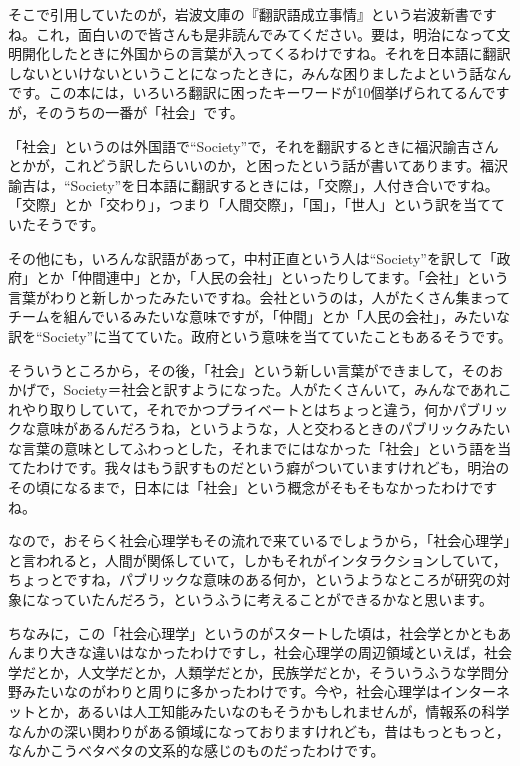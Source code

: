\documentclass{ltjsbook}
\begin{document}
そこで引用していたのが，岩波文庫の『翻訳語成立事情』\parencite{SPhonyaku}という岩波新書ですね。これ，面白いので皆さんも是非読んでみてください。要は，明治になって文明開化したときに外国からの言葉が入ってくるわけですね。それを日本語に翻訳しないといけないということになったときに，みんな困りましたよという話なんです。この本には，いろいろ翻訳に困ったキーワードが10個挙げられてるんですが，そのうちの一番が「社会」です。

「社会」というのは外国語で``Society''で，それを翻訳するときに福沢諭吉さんとかが，これどう訳したらいいのか，と困ったという話が書いてあります。福沢諭吉は，``Society''を日本語に翻訳するときには，「交際」，人付き合いですね。「交際」とか「交わり」，つまり「人間交際」，「国」，「世人」という訳を当てていたそうです。

その他にも，いろんな訳語があって，中村正直という人は``Society''を訳して「政府」とか「仲間連中」とか，「人民の会社」といったりしてます。「会社」という言葉がわりと新しかったみたいですね。会社というのは，人がたくさん集まってチームを組んでいるみたいな意味ですが，「仲間」とか「人民の会社」，みたいな訳を``Society''に当てていた。政府という意味を当てていたこともあるそうです。

そういうところから，その後，「社会」という新しい言葉ができまして，そのおかげで，Society＝社会と訳すようになった。人がたくさんいて，みんなであれこれやり取りしていて，それでかつプライベートとはちょっと違う，何かパブリックな意味があるんだろうね，というような，人と交わるときのパブリックみたいな言葉の意味としてふわっとした，それまでにはなかった「社会」という語を当てたわけです。我々はもう訳すものだという癖がついていますけれども，明治のその頃になるまで，日本には「社会」という概念がそもそもなかったわけですね。

なので，おそらく社会心理学もその流れで来ているでしょうから，「社会心理学」と言われると，人間が関係していて，しかもそれがインタラクションしていて，ちょっとですね，パブリックな意味のある何か，というようなところが研究の対象になっていたんだろう，というふうに考えることができるかなと思います。

ちなみに，この「社会心理学」というのがスタートした頃は，社会学とかともあんまり大きな違いはなかったわけですし，社会心理学の周辺領域といえば，社会学だとか，人文学だとか，人類学だとか，民族学だとか，そういうふうな学問分野みたいなのがわりと周りに多かったわけです。今や，社会心理学はインターネットとか，あるいは人工知能みたいなのもそうかもしれませんが，情報系の科学なんかの深い関わりがある領域になっておりますけれども，昔はもっともっと，なんかこうベタベタの文系的な感じのものだったわけです。
\end{document}
